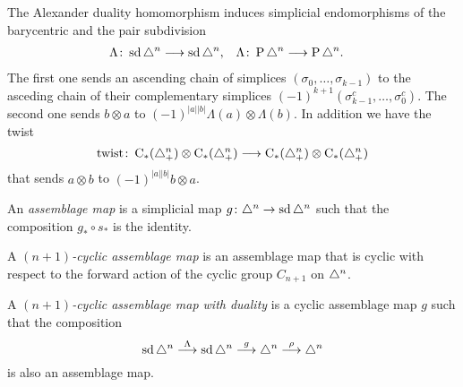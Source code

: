 The Alexander duality homomorphism induces simplicial endomorphisms of the barycentric and the pair subdivision
\begin{align*}
\Lambda\colon \operatorname{sd} \triangle^n&\longrightarrow \operatorname{sd} \triangle^n,
&
\Lambda\colon \operatorname{P} \triangle^n&\longrightarrow \operatorname{P} \triangle^n.
\end{align*}
The first one sends an ascending chain of simplices $(\sigma_0,\ldots,\sigma_{k-1})$ to the asceding chain of their complementary simplices $(-1)^{k+1}(\sigma_{k-1}^c,\ldots,\sigma_0^c)$. The second one sends $b\otimes a$ to $(-1)^{|a||b|}\Lambda(a)\otimes \Lambda(b)$. In addition we have the twist
\[\mathrm{twist}\colon \operatorname{C}_*(\triangle_{+}^n)\otimes \operatorname{C}_*(\triangle_{+}^n)\longrightarrow \operatorname{C}_*(\triangle_{+}^n)\otimes \operatorname{C}_*(\triangle_{+}^n)\]
that sends $a\otimes b$ to $(-1)^{|a||b|} b\otimes a$.
\begin{definition}
    An \emph{assemblage map} is a simplicial map $g\colon \triangle^n\to \operatorname{sd} \triangle^n$ such that the composition $g_*\circ s_*$ is the identity.
\end{definition}
\begin{definition}
    A \emph{$(n+1)$-cyclic assemblage map} is an assemblage map that is cyclic with respect to the forward action of the cyclic group $C_{n+1}$ on $\triangle^n$.
\end{definition}
\begin{definition}
    A \emph{$(n+1)$-cyclic assemblage map with duality} is a cyclic assemblage map $g$ such that the composition
    \[\operatorname{sd} \triangle^n \overset{\Lambda}{\longrightarrow} \operatorname{sd} \triangle^n \overset{g}{\longrightarrow} \triangle^n\overset{\rho}{\longrightarrow} \triangle^n \]
    is also an assemblage map.
\end{definition}

